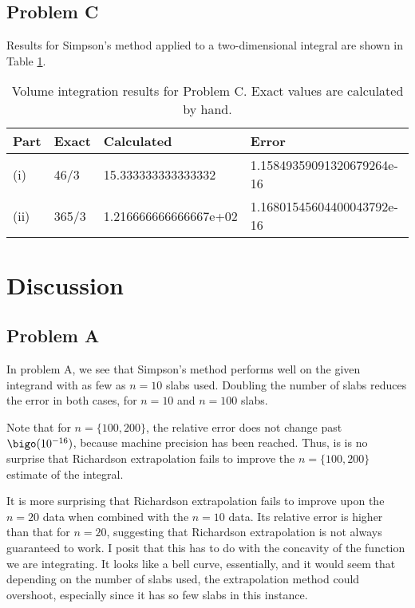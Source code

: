 \documentclass[12pt]{article}
\begin{document}
\subsection{Problem C}

Results for Simpson's method applied to a two-dimensional integral are shown in Table \ref{t:c}.

\begin{table}[h!]
\centering
\begin{tabular}{l|lll}
Part & Exact & Calculated            & Error                      \\ \hline
(i)  & 46/3  & 15.333333333333332    & 1.15849359091320679264e-16 \\
(ii) & 365/3 & 1.216666666666667e+02 & 1.16801545604400043792e-16
\end{tabular}
\vspace{6pt}
\caption{Volume integration results for Problem C. Exact values are calculated by hand.}
\label{t:c}
\end{table}

\section{Discussion}

\subsection{Problem A}

In problem A, we see that Simpson's method performs well on the given integrand with as few as $n=10$ slabs used. Doubling the number of slabs reduces the error in both cases, for $n=10$ and $n=100$ slabs.

Note that for $n = \{100, 200\}$, the relative error does not change past $\bigo(10^{-16})$, because machine precision has been reached. Thus, is is no surprise that Richardson extrapolation fails to improve the $n=\{100,200\}$ estimate of the integral.

It is more surprising that Richardson extrapolation fails to improve upon the $n=20$ data when combined with the $n=10$ data. Its relative error is higher than that for $n=20$, suggesting that Richardson extrapolation is not always guaranteed to work. I posit that this has to do with the concavity of the function we are integrating. It looks like a bell curve, essentially, and it would seem that depending on the number of slabs used, the extrapolation method could overshoot, especially since it has so few slabs in this instance.
\end{document}
